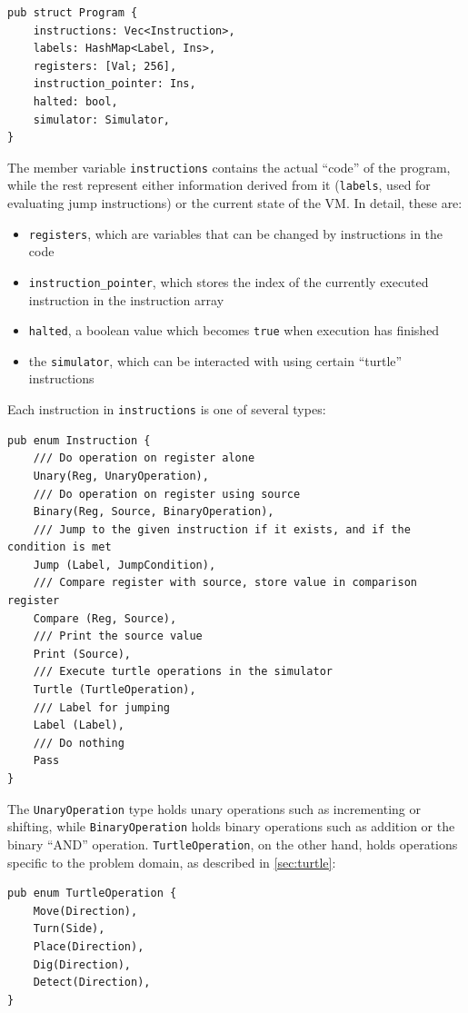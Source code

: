\documentclass{report}
\begin{document}
\begin{verbatim}
pub struct Program {
    instructions: Vec<Instruction>,
    labels: HashMap<Label, Ins>,
    registers: [Val; 256],
    instruction_pointer: Ins,
    halted: bool,
    simulator: Simulator,
}
\end{verbatim}

The member variable \verb|instructions| contains the actual ``code'' of the program, while the rest represent either information derived from it (\verb|labels|, used for evaluating jump instructions) or the current state of the VM. In detail, these are:

\begin{itemize}
    \item \verb|registers|, which are variables that can be changed by instructions in the code
    \item \verb|instruction_pointer|, which stores the index of the currently executed instruction in the instruction array
    \item \verb|halted|, a boolean value which becomes \verb|true| when execution has finished
    \item the \verb|simulator|, which can be interacted with using certain ``turtle'' instructions
\end{itemize}

Each instruction in \verb|instructions| is one of several types:
\begin{verbatim}
pub enum Instruction {
    /// Do operation on register alone
    Unary(Reg, UnaryOperation),
    /// Do operation on register using source
    Binary(Reg, Source, BinaryOperation),
    /// Jump to the given instruction if it exists, and if the condition is met
    Jump (Label, JumpCondition),
    /// Compare register with source, store value in comparison register
    Compare (Reg, Source),
    /// Print the source value
    Print (Source),
    /// Execute turtle operations in the simulator
    Turtle (TurtleOperation),
    /// Label for jumping
    Label (Label),
    /// Do nothing
    Pass
}
\end{verbatim}

The \verb|UnaryOperation| type holds unary operations such as incrementing or shifting, while \verb|BinaryOperation| holds binary operations such as addition or the binary ``AND'' operation. \verb|TurtleOperation|, on the other hand, holds operations specific to the problem domain, as described in \autoref{sec:turtle}:

\begin{verbatim}
pub enum TurtleOperation {
    Move(Direction),
    Turn(Side),
    Place(Direction),
    Dig(Direction),
    Detect(Direction),
}
\end{verbatim}
\end{document}
